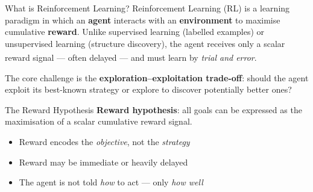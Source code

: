 \begin{v3topic}{What is Reinforcement Learning?}
        Reinforcement Learning (RL) is a learning paradigm in which an
        \textbf{agent} interacts with an \textbf{environment} to maximise
        cumulative \textbf{reward}. Unlike supervised learning (labelled
        examples) or unsupervised learning (structure discovery), the agent
        receives only a scalar reward signal --- often delayed --- and must learn
        by \emph{trial and error}.\textsuperscript{\cite[][p.~323]{hurbansGrokkingArtificialIntelligence2020}}

        The core challenge is the \textbf{exploration--exploitation trade-off}:
        should the agent exploit its best-known strategy or explore to
        discover potentially better ones?

\end{v3topic}
\begin{v3topic}{The Reward Hypothesis}
        \textbf{Reward hypothesis}: all goals can be expressed as the
        maximisation of a scalar cumulative reward signal.

        \begin{itemize}
            \item Reward encodes the \emph{objective}, not the \emph{strategy}
            \item Reward may be immediate or heavily delayed
            \item The agent is not told \emph{how} to act --- only \emph{how well}
        \end{itemize}
        \textsuperscript{\cite[][p.~324]{hurbansGrokkingArtificialIntelligence2020}}

\end{v3topic}
